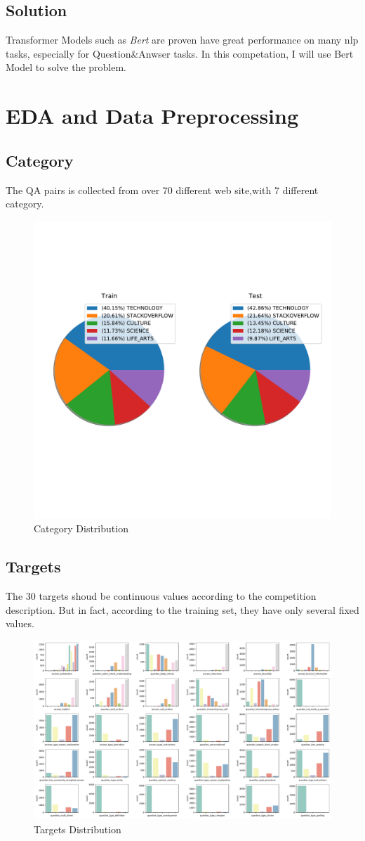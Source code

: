 \subsection{Solution}
Transformer Models such as \textit{Bert} are proven have great performance on many nlp tasks, especially for Question\&Anwser tasks.
In this competation, I will use Bert Model to solve the problem.
\newpage
\section{EDA and Data Preprocessing} \label{sec-eda}
\subsection{Category}
The QA pairs is collected from over 70 different web site,with 7 different category.
\begin{figure}[htbp]
    \centering
    \includegraphics[width=.5\linewidth]{figures/categories.pdf}
    \caption{Category Distribution}
    \label{fig:categories}
\end{figure}
\subsection{Targets}
The 30 targets shoud be continuous values according to the competition description.
But in fact, according to the training set, they have only several fixed values.
\begin{figure}[htbp]
    \centering
    \centering
    \includegraphics[width=\linewidth]{figures/targets.pdf}
    \caption{Targets Distribution}
    \label{fig:targets}
\end{figure}

